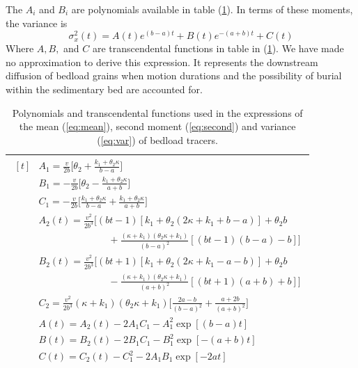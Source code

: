 \documentclass[]{agujournal2018}
\newcommand\be{\begin{equation}}
\newcommand\ee{\end{equation}}
\begin{document}
The $A_i$ and $B_i$ are polynomials available in table (\ref{table:params}).
In terms of these moments, the variance is
\be \sigma_x^2(t) = A(t)e^{(b-a)t} + B(t)e^{-(a+b)t} + C(t) \label{eq:var}\ee
Where $A, B,$ and $C$ are transcendental functions in table in (\ref{table:params}).
We have made no approximation to derive this expression.
It represents the downstream diffusion of bedload grains when motion durations and the possibility of burial within the sedimentary bed are accounted for.
\begin{table}[!h]
	\centering
	\caption{Polynomials and transcendental functions used in the expressions of the mean (\ref{eq:mean}), second moment (\ref{eq:second}) and variance (\ref{eq:var}) of bedload tracers.}
	\label{table:params}
	\begin{tabular}{c}
		\toprule
		$\begin{aligned}[t]
		&A_1 = \frac{v}{2b}\big[\theta_2+\frac{k_1+\theta_2\kappa}{b-a}\big] \\
		&B_1 = -\frac{v}{2b}\big[\theta_2-\frac{k_1+\theta_2 \kappa}{a+b}\big] \\
		&C_1 =  -\frac{v}{2b}\big[\frac{k_1+\theta_2 \kappa}{b-a}+\frac{k_1+\theta_2 \kappa}{a+b}\big]\\
		&A_2(t) = \frac{v^2}{2b^3}\Big[(bt-1)[k_1+\theta_2(2\kappa + k_1 + b-a)]+\theta_2b \\
		&\hspace{3cm} + \frac{(\kappa+k_1)(\theta_2\kappa+k_1)}{(b-a)^2}[(bt-1)(b-a)-b]\Big]\\
		&B_2(t) = \frac{v^2}{2b^3}\Big[(bt+1)[k_1 + \theta_2(2\kappa+k_1-a-b)]+\theta_2b\\
		&\hspace{3cm} -\frac{(\kappa+k_1)(\theta_2\kappa+k_1)}{(a+b)^2}[(bt+1)(a+b)+b]\Big]\\
		&C_2 = \frac{v^2}{2b^3}(\kappa+k_1)(\theta_2 \kappa + k_1)\Big[\frac{2a-b}{(b-a)^2}+\frac{a+2b}{(a+b)^2}\Big]\\
		&A(t) = A_2(t)-2A_1C_1 - A_1^2\exp[(b-a)t]\\
		&B(t) = B_2(t)-2B_1C_1 - B_1^2\exp[-(a+b)t]\\
		&C(t) = C_2(t)-C_1^2-2A_1B_1\exp[-2at]\\			
		\end{aligned}$\\
		\bottomrule
	\end{tabular}
\end{table}

\end{document}
